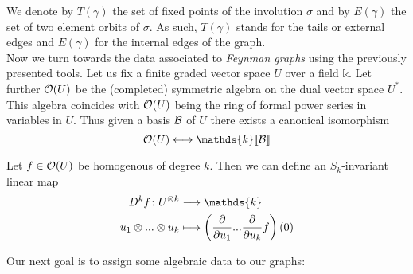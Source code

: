 We denote by $T(\gamma)$ the set of fixed points of the involution $\sigma$ and by $E(\gamma)$ the set of two element orbits of $\sigma$. As such, $T(\gamma)$ stands for the tails or external edges and $E(\gamma)$ for the internal edges of the graph.\\

Now we turn towards the data associated to \emph{Feynman graphs} using the previously presented tools. Let us fix a finite graded vector space $U$ over a field $\mathds{k}$. Let further $\mathcal{O}(U)$ be the (completed) symmetric algebra on the dual vector space $U^*$. This algebra coincides with $\mathcal{O}(U)$ being the ring of formal power series in variables in $U$. Thus given a basis $\mathcal{B}$ of $U$ there exists a canonical isomorphism
$$ \OO(U) \longleftrightarrow \mathds{k}\llbracket\BB\rrbracket $$

\begin{definition}
  Let $f \in \mathcal{O}(U)$ be homogenous of degree $k$. Then we can define an $S_k$-invariant linear map
  \begin{align*}
    D^kf \colon U^{\otimes k} &\lra \mathds{k}\\
    u_1 \otimes ... \otimes u_k &\lmap \left( \dell{}{u_1} ... \dell{}{u_k} f \right) (0)
  \end{align*}
\end{definition}

Our next goal is to assign some algebraic data to our graphs:

